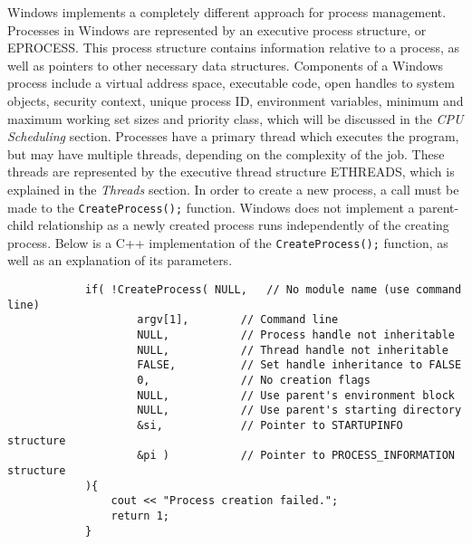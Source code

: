 \documentclass[10pt, onecolumn]{IEEEtran}
\begin{document}
        \vspace{3mm}
        
        Windows implements a completely different approach for process management. Processes in Windows are represented by an executive process structure, or EPROCESS. This process structure contains information relative to a process, as well as pointers to other necessary data structures. Components of a Windows process include a virtual address space, executable code, open handles to system objects, security context, unique process ID, environment variables, minimum and maximum working set sizes and  priority class, which will be discussed in the \textit{CPU Scheduling} section. Processes have a primary thread which executes the program, but may have multiple threads, depending on the complexity of the job. These threads are represented by the executive thread structure ETHREADS, which is explained in the \textit{Threads} section. In order to create a new process, a call must be made to the \texttt{CreateProcess();} function. Windows does not implement a parent-child relationship as a newly created process runs independently of the creating process. Below is a C++ implementation of the \texttt{CreateProcess();} function, as well as an explanation of its parameters.
        
        \begin{lstlisting}
            if( !CreateProcess( NULL,   // No module name (use command line)
                    argv[1],        // Command line
                    NULL,           // Process handle not inheritable
                    NULL,           // Thread handle not inheritable
                    FALSE,          // Set handle inheritance to FALSE
                    0,              // No creation flags
                    NULL,           // Use parent's environment block
                    NULL,           // Use parent's starting directory 
                    &si,            // Pointer to STARTUPINFO structure
                    &pi )           // Pointer to PROCESS_INFORMATION structure
            ){
                cout << "Process creation failed.";
                return 1;
            }
        \end{lstlisting}
        
\end{document}
